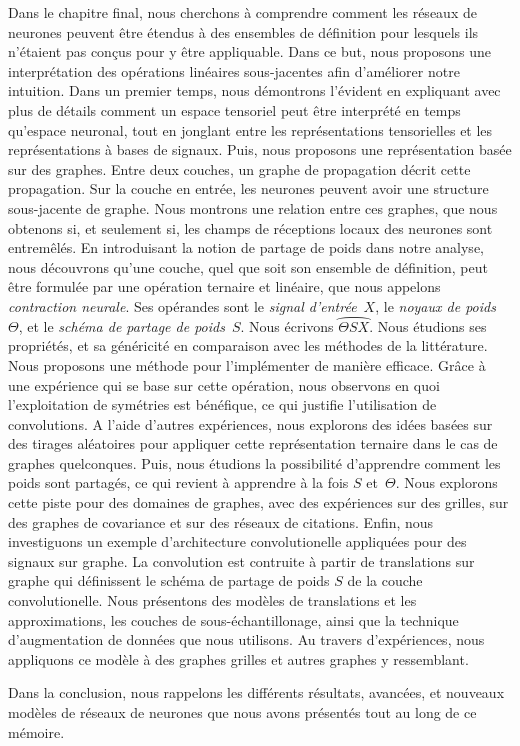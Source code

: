 Dans le chapitre final, nous cherchons à comprendre comment les réseaux de neurones peuvent être étendus à des ensembles de définition pour lesquels ils n'étaient pas conçus pour y être appliquable. Dans ce but, nous proposons une interprétation des opérations linéaires sous-jacentes afin d'améliorer notre intuition. Dans un premier temps, nous démontrons l'évident en expliquant avec plus de détails comment un espace tensoriel peut être interprété en temps qu'espace neuronal, tout en jonglant entre les représentations tensorielles et les représentations à bases de signaux. Puis, nous proposons une représentation basée sur des graphes. Entre deux couches, un graphe de propagation décrit cette propagation. Sur la couche en entrée, les neurones peuvent avoir une structure sous-jacente de graphe. Nous montrons une relation entre ces graphes, que nous obtenons si, et seulement si, les champs de réceptions locaux des neurones sont entremêlés. En introduisant la notion de partage de poids dans notre analyse, nous découvrons qu'une couche, quel que soit son ensemble de définition, peut être formulée par une opération ternaire et linéaire, que nous appelons \emph{contraction neurale}. Ses opérandes sont le \emph{signal d'entrée}~$X$, le \emph{noyaux de poids}~$\Theta$, et le \emph{schéma de partage de poids}~$S$. Nous écrivons $\wideparen{\Theta S X}$. Nous étudions ses propriétés, et sa généricité en comparaison avec les méthodes de la littérature. Nous proposons une méthode pour l'implémenter de manière efficace. Grâce à une expérience qui se base sur cette opération, nous observons en quoi l'exploitation de symétries est bénéfique, ce qui justifie l'utilisation de convolutions. A l'aide d'autres expériences, nous explorons des idées basées sur des tirages aléatoires pour appliquer cette représentation ternaire dans le cas de graphes quelconques. Puis, nous étudions la possibilité d'apprendre comment les poids sont partagés, ce qui revient à apprendre à la fois $S$ et~$\Theta$. Nous explorons cette piste pour des domaines de graphes, avec des expériences sur des grilles, sur des graphes de covariance et sur des réseaux de citations. Enfin, nous investiguons un exemple d'architecture convolutionelle appliquées pour des signaux sur graphe. La convolution est contruite à partir de translations sur graphe qui définissent le schéma de partage de poids $S$ de la couche convolutionelle. Nous présentons des modèles de translations et les approximations, les couches de sous-échantillonage, ainsi que la technique d'augmentation de données que nous utilisons. Au travers d'expériences, nous appliquons ce modèle à des graphes grilles et autres graphes y ressemblant.

Dans la conclusion, nous rappelons les différents résultats, avancées, et nouveaux modèles de réseaux de neurones que nous avons présentés tout au long de ce mémoire.